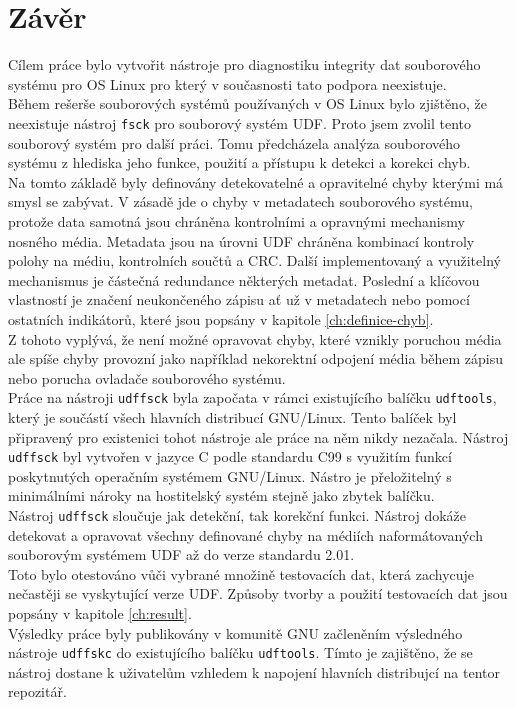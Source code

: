 \chapter{Závěr}
Cílem práce bylo vytvořit nástroje pro diagnostiku integrity dat souborového systému pro OS Linux pro který v současnosti tato podpora neexistuje.\\
Během rešerše souborových systémů používaných v OS Linux bylo zjištěno, že neexistuje nástroj \texttt{fsck} pro souborový systém UDF. Proto jsem zvolil tento souborový systém pro další práci. Tomu předcházela analýza souborového systému z hlediska jeho funkce, použití a přístupu k detekci a korekci chyb.\\
Na tomto základě byly definovány detekovatelné a opravitelné chyby kterými má smysl se zabývat. V zásadě jde o chyby v metadatech souborového systému, protože data samotná jsou chráněna kontrolními a opravnými mechanismy nosného média. Metadata jsou na úrovni UDF chráněna kombinací kontroly polohy na médiu, kontrolních součtů a CRC. Další implementovaný a využitelný mechanismus je částečná redundance některých metadat. Poslední a klíčovou vlastností je značení neukončeného zápisu ať už v metadatech nebo pomocí ostatních indikátorů, které jsou popsány v kapitole \ref{ch:definice-chyb}.\\
Z tohoto vyplývá, že není možné opravovat chyby, které vznikly poruchou média ale spíše chyby provozní jako například nekorektní odpojení média během zápisu nebo porucha ovladače souborového systému.\\
Práce na nástroji \texttt{udffsck} byla započata v rámci existujícího balíčku \texttt{udftools}, který je součástí všech hlavních distribucí GNU/Linux. Tento balíček byl připravený pro existenici tohot nástroje ale práce na něm nikdy nezačala. Nástroj \texttt{udffsck} byl vytvořen v jazyce C podle standardu C99 s využitím funkcí poskytnutých operačním systémem \mbox{GNU/Linux}. Nástro je přeložitelný s minimálními nároky na hostitelský systém stejně jako zbytek balíčku.\\
Nástroj \texttt{udffsck} sloučuje jak detekční, tak korekční funkci. Nástroj dokáže detekovat a opravovat všechny definované chyby na médiích naformátovaných souborovým systémem UDF až do verze standardu 2.01.\\
Toto bylo otestováno vůči vybrané množině testovacích dat, která zachycuje nečastěji se vyskytující verze UDF. Způsoby tvorby a použití testovacích dat jsou popsány v kapitole \ref{ch:result}.\\
Výsledky práce byly publikovány v komunitě GNU začleněním výsledného nástroje \texttt{udffskc} do existujícího balíčku \texttt{udftools}. Tímto je zajištěno, že se nástroj dostane k uživatelům vzhledem k napojení hlavních distribujcí na tentor repozitář.\\

